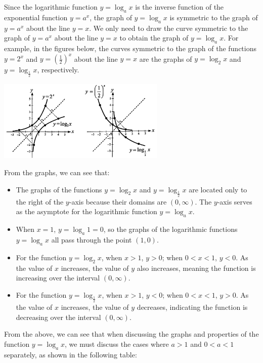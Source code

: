 \documentclass{report}
\begin{document}
        Since the logarithmic function $y=\log _a x$ is the inverse function of the exponential function $y=a^x$, the graph of $y=\log _a x$ is symmetric to the graph of $y=a^x$ about the line $y=x$. We only need to draw the curve symmetric to the graph of $y=a^x$ about the line $y=x$ to obtain the graph of $y=\log _a x$. For example, in the figures below, the curves symmetric to the graph of the functions $y=2^x$ and $y=\left(\frac{1}{2}\right)^x$ about the line $y=x$ are the graphs of $y=\log _2 x$ and $y=\log _{\frac{1}{2}} x$, respectively.
        \begin{center}
            \includegraphics[width=0.6\textwidth]{assets/12-5.png}
        \end{center}

        From the graphs, we can see that:
        \begin{itemize}
            \item The graphs of the functions $y=\log _2 x$ and $y=\log _{\frac{1}{2}} x$ are located only to the right of the $y$-axis because their domains are $(0, \infty)$.
            The $y$-axis serves as the asymptote for the logarithmic function $y=\log _a x$.
            \item When $x=1$, $y=\log _a 1=0$, so the graphs of the logarithmic functions $y=\log _a x$ all pass through the point $(1,0)$.
            \item For the function $y=\log _2 x$, when $x>1$, $y>0$; when $0<x<1$, $y<0$. As the value of $x$ increases, the value of $y$ also increases, meaning the function is increasing over the interval $(0, \infty)$.
            \item For the function $y=\log _{\frac{1}{2}} x$, when $x>1$, $y<0$; when $0<x<1$, $y>0$. As the value of $x$ increases, the value of $y$ decreases, indicating the function is decreasing over the interval $(0, \infty)$.
        \end{itemize}

        From the above, we can see that when discussing the graphs and properties of the function $y=\log _a x$, we must discuss the cases where $a > 1$ and $0 < a < 1$ separately, as shown in the following table:
\end{document}
